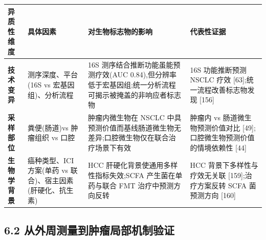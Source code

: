 {\def\LTcaptype{none} %
\begin{longtable}[]{@{}
  >{\raggedright\arraybackslash}p{}
  >{\raggedright\arraybackslash}p{}
  >{\raggedright\arraybackslash}p{}
  >{\raggedright\arraybackslash}p{}@{}}
\toprule\noalign{}
\begin{minipage}[b]{\linewidth}\raggedright
异质性维度
\end{minipage} & \begin{minipage}[b]{\linewidth}\raggedright
具体因素
\end{minipage} & \begin{minipage}[b]{\linewidth}\raggedright
对生物标志物的影响
\end{minipage} & \begin{minipage}[b]{\linewidth}\raggedright
代表性证据
\end{minipage} \\
\midrule\noalign{}
\endhead
\bottomrule\noalign{}
\endlastfoot
\textbf{技术变异} & 测序深度、平台(16S vs 宏基因组)、分析流程 & 16S 测序结合推断功能虽能预测疗效(AUC 0.84),但分辨率低于宏基因组;统一分析流程可揭示被掩盖的非响应者标志物 & 16S 功能推断预测 NSCLC 疗效 {[}63{]};统一流程改善标志物发现 {[}156{]} \\
\textbf{采样部位} & 粪便(肠道)vs 肿瘤组织 vs 口腔 & 肿瘤内微生物在 NSCLC 中具预测价值而基线肠道微生物无差异;口腔微生物仅在联合治疗场景下有效 & 肿瘤内 vs 肠道微生物预测价值对比 {[}49{]};口腔微生物预测价值的情境依赖性 {[}44{]} \\
\textbf{生物学背景} & 癌种类型、ICI 方案(单药 vs 联合)、宿主因素(肝硬化、抗生素) & HCC 肝硬化背景使通用多样性指标失效;SCFA 产生菌在单药与联合 FMT 治疗中预测方向反转 & HCC 背景下多样性与疗效无关联 {[}159{]};治疗方案反转 SCFA 菌预测方向 {[}160{]} \\
\end{longtable}
}

\subsection{6.2 从外周测量到肿瘤局部机制验证}\label{ux4eceux5916ux5468ux6d4bux91cfux5230ux80bfux7624ux5c40ux90e8ux673aux5236ux9a8cux8bc1}

